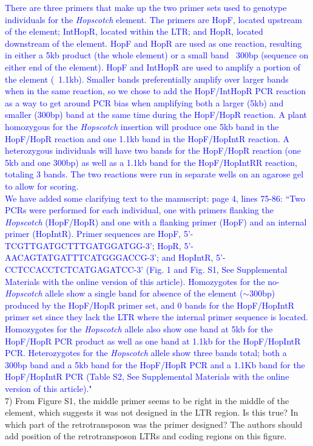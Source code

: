 \documentclass[11pt]{article}
\newcommand{\res}[1]{\noindent \textcolor{blue}{{#1}} \\}
\begin{document}
\res{There are three primers that make up the two primer sets used to genotype individuals for the \emph{Hopscotch} element. The primers are HopF, located upstream of the element; IntHopR, located within the LTR; and HopR, located downstream of the element. HopF and HopR are used as one reaction, resulting in either a 5kb product (the whole element) or a small band ~300bp (sequence on either end of the element). HopF and IntHopR are used to amplify a portion of the element (~1.1kb). Smaller bands preferentially amplify over larger bands when in the same reaction, so we chose to add the HopF/IntHopR PCR reaction as a way to get around PCR bias when amplifying both a larger (5kb) and smaller (300bp) band at the same time during the HopF/HopR reaction. A plant homozygous for the \emph{Hopscotch} insertion will produce one 5kb band in the HopF/HopR reaction and one 1.1kb band in the HopF/HopIntR reaction. A heterozygous individuals will have two bands for the HopF/HopR reaction (one 5kb and one 300bp) as well as a 1.1kb band for the HopF/HopIntRR reaction, totaling 3 bands. The two reactions were run in separate wells on an agarose gel to allow for scoring.}

\res{We have added some clarifying text to the manuscript: page 4, lines 75-86: ``Two PCRs were performed for each individual, one with primers flanking the \emph{Hopscotch} (HopF/HopR) and one with a flanking primer (HopF) and an internal primer (HopIntR). Primer sequences are HopF, {\small 5'-TCGTTGATGCTTTGATGGATGG-3'}; 
HopR, {\small 5'-AACAGTATGATTTCATGGGACCG-3'}; and HopIntR, {\small  5'-CCTCCACCTCTCATGAGATCC-3'} (Fig. 1 and Fig. S1, See Supplemental Materials with the online version of this article). Homozygotes for the no-\emph{Hopscotch} allele show a single band for absence of the element ($\sim$300bp) produced by the HopF/HopR primer set, and 0 bands for the HopF/HopIntR primer set since they lack the LTR where the internal primer sequence is located. Homozygotes for the \emph{Hopscotch} allele also show one band at 5kb for the HopF/HopR PCR product as well as one band at 1.1kb for the HopF/HopIntR PCR. Heterozygotes for the \emph{Hopscotch} allele show three bands total; both a 300bp band and a 5kb band for the HopF/HopR PCR and a 1.1Kb band for the HopF/HopIntR PCR (Table S2, See Supplemental Materials with the online version of this article)."}





7) From Figure S1, the middle primer seems to be right in the middle of the element, which suggests it was not designed in the LTR region. Is this true? In which part of the retrotransposon was the primer designed? The authors should add position of the retrotransposon LTRs and coding regions on this figure. \\
\end{document}
